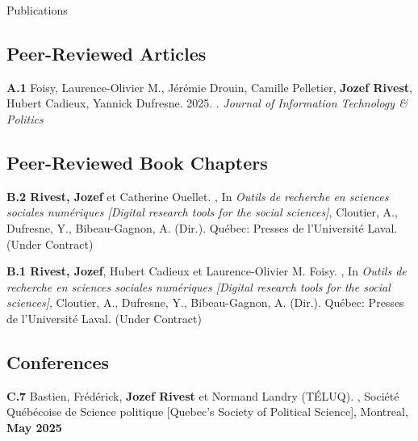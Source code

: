 \documentclass{resume} %
\begin{document}
\begin{rSection}{Publications}

\subsection*{Peer-Reviewed Articles}

\textbf{A.1} Foisy, Laurence-Olivier M., Jérémie Drouin, Camille Pelletier, \textbf{Jozef Rivest}, Hubert Cadieux, Yannick Dufresne. 2025. . \textit{Journal of Information Technology \& Politics} 

\subsection*{Peer-Reviewed Book Chapters}

{\textbf{B.2 Rivest, Jozef} et Catherine Ouellet. , In \textit{Outils de recherche en sciences sociales numériques [Digital research tools for the social sciences]}, Cloutier, A., Dufresne, Y., Bibeau-Gagnon, A. (Dir.). Québec: Presses de l'Université Laval. (Under Contract)} \par

{\textbf{B.1 Rivest, Jozef}, Hubert Cadieux et Laurence-Olivier M. Foisy. , In \textit{Outils de recherche en sciences sociales numériques [Digital research tools for the social sciences]}, Cloutier, A., Dufresne, Y., Bibeau-Gagnon, A. (Dir.). Québec: Presses de l'Université Laval.} (Under Contract) \par

\subsection*{Conferences}

{\textbf{C.7} Bastien, Frédérick, \textbf{Jozef Rivest} et Normand Landry (TÉLUQ). , Société Québécoise de Science politique [Quebec's Society of Political Science], Montreal, \textbf{May 2025}}


\end{rSection}
\end{document}
